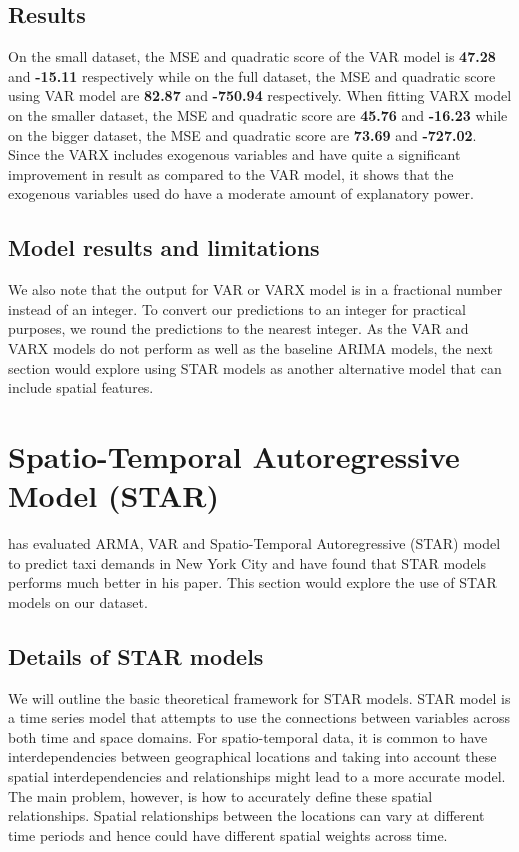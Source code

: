 \documentclass[nonblindrev,msom]{informs3} %
\begin{document}
\subsection{Results}
On the small dataset, the MSE and quadratic score of the VAR model is \textbf{47.28} and \textbf{-15.11} respectively while on the full dataset, the MSE and quadratic score using VAR model are \textbf{82.87} and \textbf{-750.94} respectively. When fitting VARX model on the smaller dataset, the MSE and quadratic score are \textbf{45.76} and \textbf{-16.23} while on the bigger dataset, the MSE and quadratic score are \textbf{73.69} and \textbf{-727.02}. Since the VARX includes exogenous variables and have quite a significant improvement in result as compared to the VAR model, it shows that the exogenous variables used do have a moderate amount of explanatory power. 

\subsection{Model results and limitations}

We also note that the output for VAR or VARX model is in a fractional number instead of an integer. To convert our predictions to an integer for practical purposes, we round the predictions to the nearest integer. As the VAR and VARX models do not perform as well as the baseline ARIMA models, the next section would explore using STAR models as another alternative model that can include spatial features. 

\newpage

\section{Spatio-Temporal Autoregressive Model (STAR)}

\cite{Abolfazl2017} has evaluated ARMA, VAR and Spatio-Temporal Autoregressive (STAR) model to predict taxi demands in New York City and have found that STAR models performs much better in his paper. This section would explore the use of STAR models on our dataset. 

\subsection{Details of STAR models}

\noindent We will outline the basic theoretical framework for STAR models. STAR model is a time series model that attempts to use the connections between variables across both time and space domains. For spatio-temporal data, it is common to have interdependencies between geographical locations and taking into account these spatial interdependencies and relationships might lead to a more accurate model. The main problem, however, is how to accurately define these spatial relationships. Spatial relationships between the locations can vary at different time periods and hence could have different spatial weights across time.  \\
\end{document}
